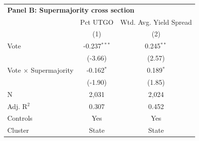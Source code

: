 \begingroup
\centering
\begin{tabular*}{\textwidth}{@{\extracolsep{\fill}}lcc}
\multicolumn{3}{l}{\textbf{Panel B: Supermajority cross section}}\\

\addlinespace
   \toprule
                                & Pct UTGO       & Wtd. Avg. Yield Spread\\  
                                & (1)            & (2)\\  
   \midrule 
   Vote                         & -0.237$^{***}$ & 0.245$^{**}$\\   
                                & (-3.66)       & (2.57)\\   
   Vote $\times$ Supermajority  & -0.162$^{*}$   & 0.189$^{*}$\\   
                                & (-1.90)       & (1.85)\\   
   \hline
   N                 & 2,031          & 2,024\\  
   Adj. R$^2$               & 0.307          & 0.452\\  
   Controls                   & Yes            & Yes\\
   Cluster              & State & State\\  
   \bottomrule
\end{tabular*}
\par\endgroup
